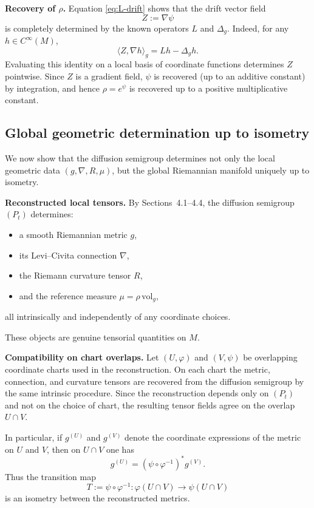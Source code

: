 \documentclass[11pt]{amsart}
\theoremstyle{definition}
\theoremstyle{remark}
\begin{document}
\medskip
\noindent\textbf{Recovery of $\rho$.}
Equation \eqref{eq:L-drift} shows that the drift vector field
\[
Z := \nabla\psi
\]
is completely determined by the known operators $L$ and $\Delta_g$.
Indeed, for any $h\in C^\infty(M)$,
\[
\langle Z,\nabla h\rangle_g = Lh - \Delta_g h.
\]
Evaluating this identity on a local basis of coordinate functions determines $Z$
pointwise.
Since $Z$ is a gradient field, $\psi$ is recovered (up to an additive constant) by
integration, and hence $\rho=e^\psi$ is recovered up to a positive multiplicative constant.
\subsection{Global geometric determination up to isometry}
\label{subsec:global-isometry}

We now show that the diffusion semigroup determines not only the local geometric data
$(g,\nabla,R,\mu)$, but the global Riemannian manifold uniquely up to isometry.

\medskip
\noindent\textbf{Reconstructed local tensors.}
By Sections~4.1--4.4, the diffusion semigroup $(P_t)$ determines:
\begin{itemize}
\item a smooth Riemannian metric $g$,
\item its Levi--Civita connection $\nabla$,
\item the Riemann curvature tensor $R$,
\item and the reference measure $\mu=\rho\,\mathrm{vol}_g$,
\end{itemize}
all intrinsically and independently of any coordinate choices.

These objects are genuine tensorial quantities on $M$.

\medskip
\noindent\textbf{Compatibility on chart overlaps.}
Let $(U,\varphi)$ and $(V,\psi)$ be overlapping coordinate charts used in the reconstruction.
On each chart the metric, connection, and curvature tensors are recovered from the diffusion
semigroup by the same intrinsic procedure.
Since the reconstruction depends only on $(P_t)$ and not on the choice of chart,
the resulting tensor fields agree on the overlap $U\cap V$.

In particular, if $g^{(U)}$ and $g^{(V)}$ denote the coordinate expressions of the metric
on $U$ and $V$, then on $U\cap V$ one has
\[
g^{(U)} = (\psi\circ\varphi^{-1})^* g^{(V)}.
\]
Thus the transition map
\[
T := \psi\circ\varphi^{-1} : \varphi(U\cap V)\longrightarrow\psi(U\cap V)
\]
is an isometry between the reconstructed metrics.
\end{document}
